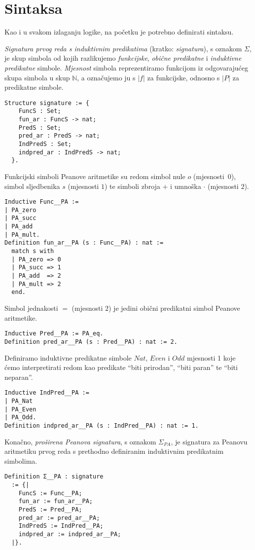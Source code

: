 \section{Sintaksa}\label{sec:sintaksa}
Kao i u svakom izlaganju logike, na početku je potrebno definirati sintaksu.
\begin{definition}\label{def:signatura}
  \textit{Signatura prvog reda s induktivnim predikatima} (kratko: \textit{signatura}), s oznakom \(\Sigma\),
  je skup simbola od kojih razlikujemo \textit{funkcijske}, \textit{obične predikatne}
  i \textit{induktivne predikatne} simbole.
  \textit{Mjesnost} simbola reprezentiramo funkcijom iz odgovarajućeg skupa simbola u skup \(\mathbb{N}\),
  a označujemo ju s \(|f|\) za funkcijske, odnosno s \(|P|\) za predikatne simbole.
\begin{verbatim}
Structure signature := {
    FuncS : Set;
    fun_ar : FuncS -> nat;
    PredS : Set;
    pred_ar : PredS -> nat;
    IndPredS : Set;
    indpred_ar : IndPredS -> nat;
  }.
\end{verbatim}
\end{definition}
\begin{example}
  Funkcijski simboli Peanove aritmetike su redom simbol nule \(o\) (mjesnosti~\(0\)),
  simbol sljedbenika \(s\) (mjesnosti \(1\))
  te simboli zbroja \(+\) i umnoška \(\cdot\) (mjesnosti \(2\)).
\begin{verbatim}
Inductive Func__PA :=
| PA_zero
| PA_succ
| PA_add
| PA_mult.
Definition fun_ar__PA (s : Func__PA) : nat :=
  match s with
  | PA_zero => 0
  | PA_succ => 1
  | PA_add  => 2
  | PA_mult => 2
  end.
\end{verbatim}
  \noindent Simbol jednakosti \(=\) (mjesnosti \(2\)) je jedini obični predikatni simbol
  Peanove aritmetike.
\begin{verbatim}
Inductive Pred__PA := PA_eq.
Definition pred_ar__PA (s : Pred__PA) : nat := 2.
\end{verbatim}
  \noindent Definiramo induktivne predikatne simbole
  \(\mathit{Nat}\), \(\mathit{Even}\) i \(\mathit{Odd}\) mjesnosti 1 koje ćemo
  interpretirati redom kao predikate \enquote{biti prirodan}, \enquote{biti paran} te
  \enquote{biti neparan}.
\begin{verbatim}
Inductive IndPred__PA :=
| PA_Nat
| PA_Even
| PA_Odd.
Definition indpred_ar__PA (s : IndPred__PA) : nat := 1.
\end{verbatim}
  \noindent Konačno, \textit{proširena Peanova signatura}, s oznakom \(\Sigma_{\mathit{PA}}\), je signatura za
  Peanovu aritmetiku prvog reda s prethodno definiranim induktivnim predikatnim simbolima.
\begin{verbatim}
Definition Σ__PA : signature
  := {|
    FuncS := Func__PA;
    fun_ar := fun_ar__PA;
    PredS := Pred__PA;
    pred_ar := pred_ar__PA;
    IndPredS := IndPred__PA;
    indpred_ar := indpred_ar__PA;
  |}.
\end{verbatim}
\end{example}

